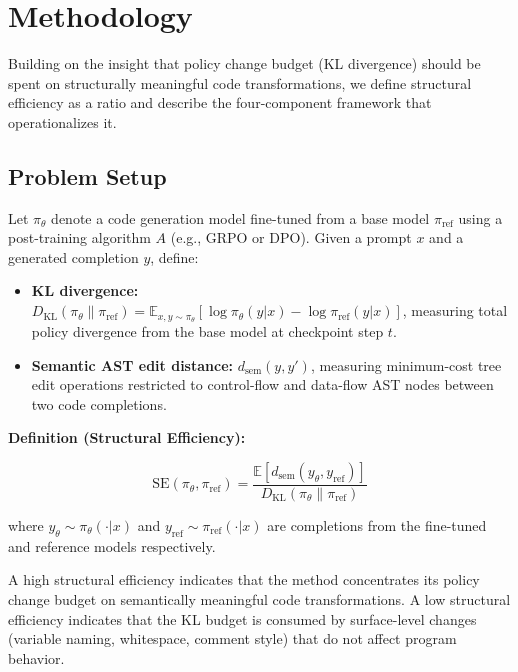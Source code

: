 \section{Methodology}
\label{sec:methodology}

Building on the insight that policy change budget (KL divergence) should be
spent on structurally meaningful code transformations, we define structural
efficiency as a ratio and describe the four-component framework that operationalizes it.

\subsection{Problem Setup}

Let $\pi_\theta$ denote a code generation model fine-tuned from a base model
$\pi_\text{ref}$ using a post-training algorithm $A$ (e.g., GRPO or DPO).
Given a prompt $x$ and a generated completion $y$, define:

\begin{itemize}
  \item \textbf{KL divergence:} $D_\text{KL}(\pi_\theta \| \pi_\text{ref}) = \mathbb{E}_{x,y \sim \pi_\theta}[\log \pi_\theta(y|x) - \log \pi_\text{ref}(y|x)]$, measuring total policy divergence from the base model at checkpoint step $t$.
  \item \textbf{Semantic AST edit distance:} $d_\text{sem}(y, y')$, measuring minimum-cost tree edit operations restricted to control-flow and data-flow AST nodes between two code completions.
\end{itemize}

\textbf{Definition (Structural Efficiency):}

\begin{equation}
\text{SE}(\pi_\theta, \pi_\text{ref}) = \frac{\mathbb{E}[d_\text{sem}(y_\theta, y_\text{ref})]}{D_\text{KL}(\pi_\theta \| \pi_\text{ref})}
\label{eq:structural_efficiency}
\end{equation}

where $y_\theta \sim \pi_\theta(\cdot|x)$ and $y_\text{ref} \sim \pi_\text{ref}(\cdot|x)$
are completions from the fine-tuned and reference models respectively.

A high structural efficiency indicates that the method concentrates its policy
change budget on semantically meaningful code transformations. A low structural
efficiency indicates that the KL budget is consumed by surface-level changes
(variable naming, whitespace, comment style) that do not affect program behavior.

